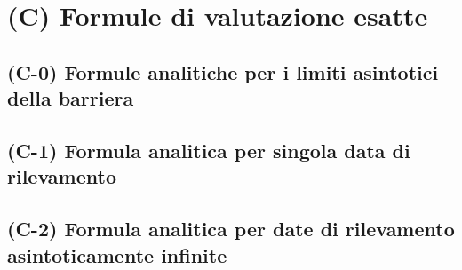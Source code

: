 \chapter{(C) Formule di valutazione esatte}

\section{(C-0) Formule analitiche per i limiti asintotici della barriera}
\lipsum[1-3]

\section{(C-1) Formula analitica per singola data di rilevamento}
\lipsum[1-3]

\section{(C-2) Formula analitica per date di rilevamento asintoticamente infinite}
\lipsum[1-3]